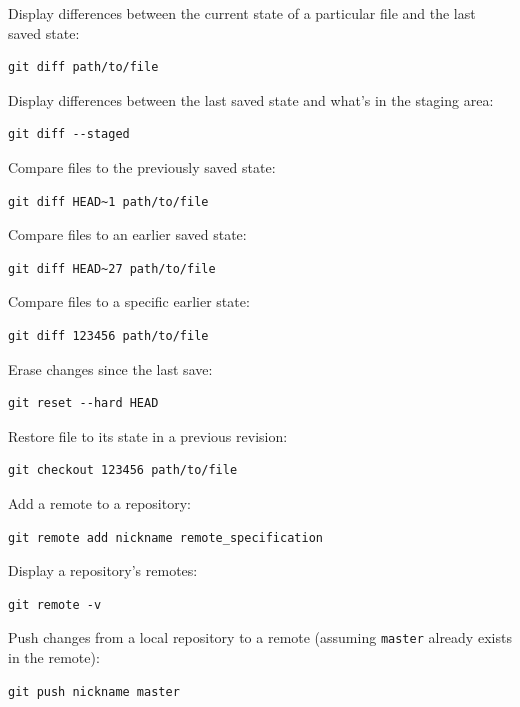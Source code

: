 \documentclass[]{book}
\begin{document}
Display differences between the current state of a particular file and
the last saved state:

\begin{verbatim}
git diff path/to/file
\end{verbatim}

Display differences between the last saved state and what's in the
staging area:

\begin{verbatim}
git diff --staged
\end{verbatim}

Compare files to the previously saved state:

\begin{verbatim}
git diff HEAD~1 path/to/file
\end{verbatim}

Compare files to an earlier saved state:

\begin{verbatim}
git diff HEAD~27 path/to/file
\end{verbatim}

Compare files to a specific earlier state:

\begin{verbatim}
git diff 123456 path/to/file
\end{verbatim}

Erase changes since the last save:

\begin{verbatim}
git reset --hard HEAD
\end{verbatim}

Restore file to its state in a previous revision:

\begin{verbatim}
git checkout 123456 path/to/file
\end{verbatim}

Add a remote to a repository:

\begin{verbatim}
git remote add nickname remote_specification
\end{verbatim}

Display a repository's remotes:

\begin{verbatim}
git remote -v
\end{verbatim}

Push changes from a local repository to a remote (assuming
\texttt{master} already exists in the remote):

\begin{verbatim}
git push nickname master
\end{verbatim}
\end{document}
